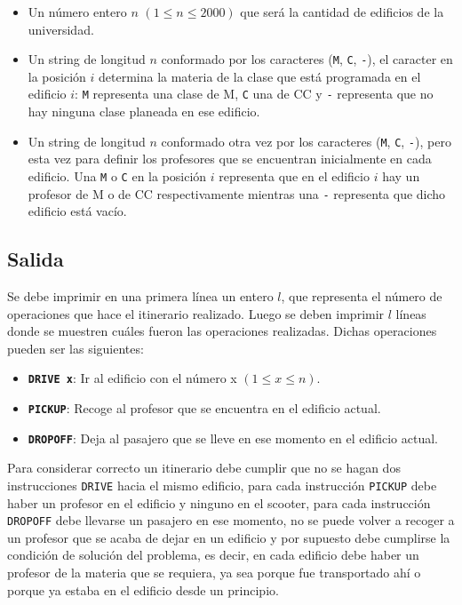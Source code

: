 \documentclass[11pt]{article}
\begin{document}
    \begin{itemize}
        \item Un número entero  $n$ $(1 \leq n \leq 2000)$ que será la cantidad de edificios de la universidad.
        \item Un string de longitud $n$ conformado por los caracteres (\texttt{M}, \texttt{C}, \texttt{-}), el caracter
              en la posición $i$ determina la materia de la clase que está programada en el edificio $i$: \texttt{M} representa
              una clase de M, \texttt{C} una de CC y \texttt{-} representa que no hay ninguna clase planeada en ese edificio.
        \item Un string de longitud $n$ conformado otra vez por los caracteres (\texttt{M}, \texttt{C}, \texttt{-}),
              pero esta vez para definir los profesores que se encuentran inicialmente en cada edificio. Una \texttt{M}
              o \texttt{C} en la posición $i$ representa que en el edificio $i$ hay un profesor de M o de CC respectivamente 
              mientras una \texttt{-} representa que dicho edificio está vacío.
    \end{itemize}

    \subsection{Salida}
    Se debe imprimir en una primera línea un entero $l$, que representa el número de operaciones que hace el
    itinerario realizado.
    Luego se deben imprimir $l$ líneas donde se muestren cuáles fueron las operaciones realizadas. Dichas operaciones
    pueden ser las siguientes:

    \begin{itemize}
        \item \textbf{\texttt{DRIVE x}}: Ir al edificio con el número x $(1 \leq x \leq n)$.
        \item \textbf{\texttt{PICKUP}}: Recoge al profesor que se encuentra en el edificio actual.
        \item \textbf{\texttt{DROPOFF}}: Deja al pasajero que se lleve en ese momento en el edificio actual.
    \end{itemize}

    Para considerar correcto un itinerario debe cumplir que no se hagan dos instrucciones \texttt{DRIVE}
    hacia el mismo edificio, para cada instrucción \texttt{PICKUP} debe haber un profesor en el edificio y
    ninguno en el scooter, para cada instrucción \texttt{DROPOFF} debe llevarse un pasajero en ese momento,
    no se puede volver a recoger a un profesor que se acaba de dejar en un edificio y por supuesto debe cumplirse
    la condición de solución del problema, es decir, en cada edificio debe haber un profesor de la materia que
    se requiera, ya sea porque fue transportado ahí o porque ya estaba en el edificio desde un principio.
\end{document}
